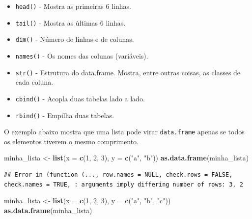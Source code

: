 \documentclass[
]{book}
\newenvironment{Shaded}{\begin{snugshade}}{\end{snugshade}}
\newcommand{\DataTypeTok}[1]{\textcolor[rgb]{0.13,0.29,0.53}{#1}}
\newcommand{\DecValTok}[1]{\textcolor[rgb]{0.00,0.00,0.81}{#1}}
\newcommand{\KeywordTok}[1]{\textcolor[rgb]{0.13,0.29,0.53}{\textbf{#1}}}
\newcommand{\NormalTok}[1]{#1}
\newcommand{\StringTok}[1]{\textcolor[rgb]{0.31,0.60,0.02}{#1}}
\providecommand{\tightlist}{%
  \setlength{\itemsep}{0pt}\setlength{\parskip}{0pt}}
\begin{document}
\begin{itemize}
\tightlist
\item
  \texttt{head()} - Mostra as primeiras 6 linhas.
\item
  \texttt{tail()} - Mostra as últimas 6 linhas.
\item
  \texttt{dim()} - Número de linhas e de colunas.
\item
  \texttt{names()} - Os nomes das colunas (variáveis).
\item
  \texttt{str()} - Estrutura do data.frame. Mostra, entre outras coisas, as classes de cada coluna.
\item
  \texttt{cbind()} - Acopla duas tabelas lado a lado.
\item
  \texttt{rbind()} - Empilha duas tabelas.
\end{itemize}

O exemplo abaixo mostra que uma lista pode virar \texttt{data.frame} apenas se todos os elementos tiverem o mesmo comprimento.

\begin{Shaded}
\begin{Highlighting}[]
\NormalTok{minha\_lista <{-}}\StringTok{ }\KeywordTok{list}\NormalTok{(}\DataTypeTok{x =} \KeywordTok{c}\NormalTok{(}\DecValTok{1}\NormalTok{, }\DecValTok{2}\NormalTok{, }\DecValTok{3}\NormalTok{), }\DataTypeTok{y =} \KeywordTok{c}\NormalTok{(}\StringTok{"a"}\NormalTok{, }\StringTok{"b"}\NormalTok{))}
\KeywordTok{as.data.frame}\NormalTok{(minha\_lista)}
\end{Highlighting}
\end{Shaded}

\begin{verbatim}
## Error in (function (..., row.names = NULL, check.rows = FALSE, check.names = TRUE, : arguments imply differing number of rows: 3, 2
\end{verbatim}

\begin{Shaded}
\begin{Highlighting}[]
\NormalTok{minha\_lista <{-}}\StringTok{ }\KeywordTok{list}\NormalTok{(}\DataTypeTok{x =} \KeywordTok{c}\NormalTok{(}\DecValTok{1}\NormalTok{, }\DecValTok{2}\NormalTok{, }\DecValTok{3}\NormalTok{), }\DataTypeTok{y =} \KeywordTok{c}\NormalTok{(}\StringTok{"a"}\NormalTok{, }\StringTok{"b"}\NormalTok{, }\StringTok{"c"}\NormalTok{))}
\KeywordTok{as.data.frame}\NormalTok{(minha\_lista)}
\end{Highlighting}
\end{Shaded}
\end{document}
